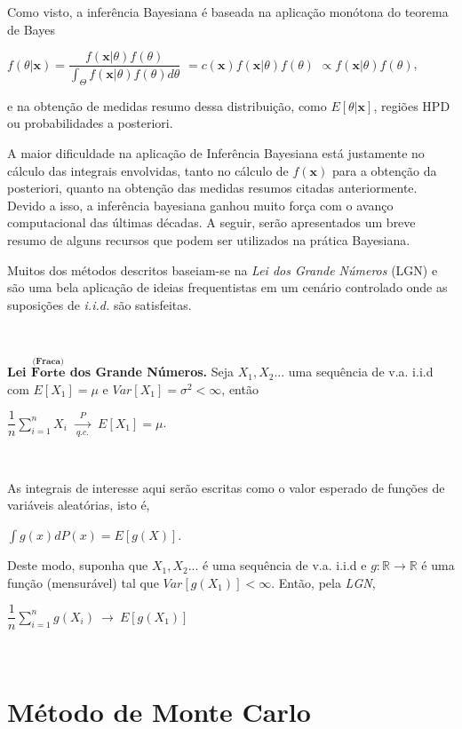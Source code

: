 \documentclass[
]{book}
\begin{document}
Como visto, a inferência Bayesiana é baseada na aplicação monótona do teorema de Bayes

\(f(\theta|\boldsymbol x)=\dfrac{f(\boldsymbol x|\theta)f(\theta)}{\displaystyle\int_\Theta f(\boldsymbol x|\theta)f(\theta)d\theta}\) \(= c(\boldsymbol x) f(\boldsymbol x|\theta)f(\theta)\) \(\propto f(\boldsymbol x|\theta)f(\theta)\),

e na obtenção de medidas resumo dessa distribuição, como \(E[\theta|\boldsymbol x]\), regiões HPD ou probabilidades a posteriori.

A maior dificuldade na aplicação de Inferência Bayesiana está justamente no cálculo das integrais envolvidas, tanto no cálculo de \(f(\boldsymbol x)\) para a obtenção da posteriori, quanto na obtenção das medidas resumos citadas anteriormente. Devido a isso, a inferência bayesiana ganhou muito força com o avanço computacional das últimas décadas. A seguir, serão apresentados um breve resumo de alguns recursos que podem ser utilizados na prática Bayesiana.

Muitos dos métodos descritos baseiam-se na \emph{Lei dos Grande Números} (LGN) e são uma bela aplicação de ideias frequentistas em um cenário controlado onde as suposições de \emph{i.i.d.} são satisfeitas.

\(~\)

\textbf{Lei \(\overset{\textbf{(Fraca)}}{\textbf{Forte}}\) dos Grande Números.} Seja \(X_1,X_2...\) uma sequência de v.a. i.i.d com \(E[X_1]=\mu\) e \(Var[X_1]=\sigma^2<\infty\), então

\(\dfrac{1}{n}\displaystyle \sum_{i=1}^n X_i ~~\underset{q.c.}{\overset{P}{\longrightarrow}}~~ E[X_1]=\mu\).

\(~\)

As integrais de interesse aqui serão escritas como o valor esperado de funções de variáveis aleatórias, isto é,

\(\displaystyle \int g(x) dP(x) = E\left[g(X)\right]\).

Deste modo, suponha que \(X_1,X_2...\) é uma sequência de v.a. i.i.d e \(g:\mathbb{R} \longrightarrow\mathbb{R}\) é uma função (mensurável) tal que \(Var\left[g(X_1)\right]<\infty\). Então, pela \emph{LGN},

\(\dfrac{1}{n}\displaystyle \sum_{i=1}^n g(X_i) ~\longrightarrow~ E\left[g(X_1)\right]\)

\(~\)

\hypertarget{muxe9todo-de-monte-carlo}{%
\section{Método de Monte Carlo}\label{muxe9todo-de-monte-carlo}}
\end{document}
